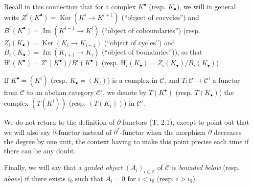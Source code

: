 \begin{env}[11.2.1]
Recall in this connection that for a complex $K^\bullet$ (resp. $K_\bullet$),
we will in general write
$Z^i(K^\bullet)=\operatorname{Ker}(K^i\to K^{i+1})$ (``object of cocycles'')
and $B^i(K^\bullet)=\operatorname{Im}(K^{i-1}\to K^i)$ (``object of
coboundaries'') (resp.
$Z_i(K_\bullet)=\operatorname{Ker}(K_i\to K_{i-1})$ (``object of cycles'')
and $B_i(K_\bullet)=\operatorname{Im}(K_{i+1}\to K_i)$ (``object of
boundaries'')), so that
$\mathrm H^i(K^\bullet)=Z^i(K^\bullet)/B^i(K^\bullet)$ (resp.
$\mathrm H_i(K_\bullet)=Z_i(K_\bullet)/B_i(K_\bullet)$).

If $K^\bullet=(K^i)$ (resp. $K_\bullet=(K_i)$) is a complex in
$\mathcal C$, and $T:\mathcal C\to\mathcal C'$ a functor from $\mathcal C$
to an abelian category $\mathcal C'$, we denote by
$T(K^\bullet)$ (resp. $T(K_\bullet)$) the complex $(T(K^i))$ (resp.
$(T(K_i))$) in $\mathcal C'$.

We do not return to the definition of $\partial$-functors (T, 2.1),
except to point out that we will also say $\partial$-functor instead of
$\partial^*$-functor when the morphism $\partial$ decreases the degree by one
unit, the context having to make this point precise each time if there can be any
doubt.

Finally, we will say that a \emph{graded object} $(A_i)_{i\in\mathbb Z}$ of
$\mathcal C$ is \emph{bounded below} (resp. \emph{above})
if there exists $i_0$ such that $A_i=0$ for $i<i_0$ (resp. $i>i_0$).
\end{env}

